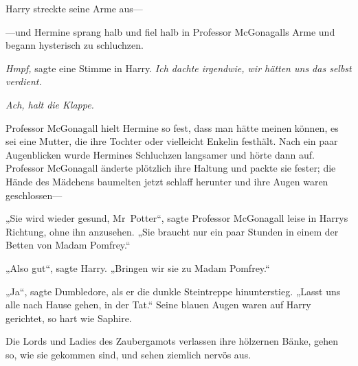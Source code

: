 Harry streckte seine Arme aus—

—und Hermine sprang halb und fiel halb in Professor McGonagalls Arme und begann hysterisch zu schluchzen.

\emph{Hmpf,} sagte eine Stimme in Harry. \emph{Ich dachte irgendwie, wir hätten uns das selbst verdient.}

\emph{Ach, halt die Klappe.}

Professor McGonagall hielt Hermine so fest, dass man hätte meinen können, es sei eine Mutter, die ihre Tochter oder vielleicht Enkelin festhält. Nach ein paar Augenblicken wurde Hermines Schluchzen langsamer und hörte dann auf. Professor McGonagall änderte plötzlich ihre Haltung und packte sie fester; die Hände des Mädchens baumelten jetzt schlaff herunter und ihre Augen waren geschlossen—

„Sie wird wieder gesund, Mr~Potter“, sagte Professor McGonagall leise in Harrys Richtung, ohne ihn anzusehen.
„Sie braucht nur ein paar Stunden in einem der Betten von Madam Pomfrey.“

„Also gut“, sagte Harry.
„Bringen wir sie zu Madam Pomfrey.“

„Ja“, sagte Dumbledore, als er die dunkle Steintreppe hinunterstieg.
„Lasst uns alle nach Hause gehen, in der Tat.“
Seine blauen Augen waren auf Harry gerichtet, so hart wie Saphire.

\later

Die Lords und Ladies des Zaubergamots verlassen ihre hölzernen Bänke, gehen so, wie sie gekommen sind, und sehen ziemlich nervös aus.


